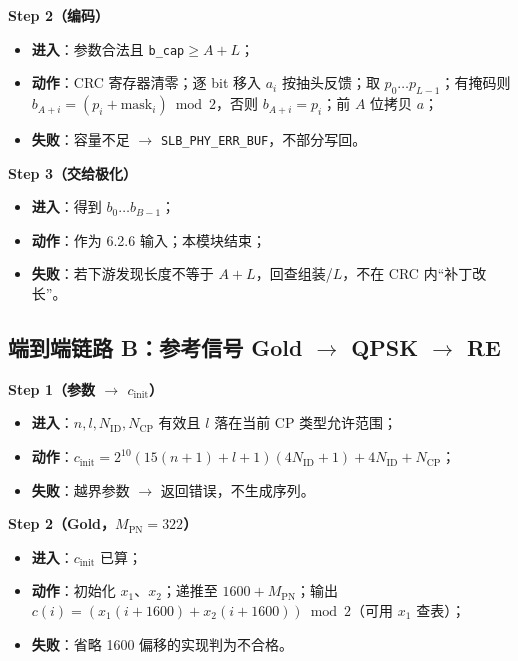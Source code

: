 \documentclass[11pt,a4paper]{ctexart}
\begin{document}
\textbf{Step 2（编码）}
\begin{itemize}[nosep]
  \item \textbf{进入}：参数合法且 \texttt{b\_cap}$\geq A{+}L$；
  \item \textbf{动作}：CRC 寄存器清零；逐 bit 移入 $a_i$ 按抽头反馈；取 $p_0\ldots p_{L-1}$；有掩码则 $b_{A+i}=(p_i+\mathrm{mask}_i)\bmod 2$，否则 $b_{A+i}=p_i$；前 $A$ 位拷贝 $a$；
  \item \textbf{失败}：容量不足 $\rightarrow$ \texttt{SLB\_PHY\_ERR\_BUF}，不部分写回。
\end{itemize}

\textbf{Step 3（交给极化）}
\begin{itemize}[nosep]
  \item \textbf{进入}：得到 $b_0\ldots b_{B-1}$；
  \item \textbf{动作}：作为 6.2.6 输入；本模块结束；
  \item \textbf{失败}：若下游发现长度不等于 $A{+}L$，回查组装/$L$，不在 CRC 内``补丁改长''。
\end{itemize}

\subsection{端到端链路 B：参考信号 Gold $\rightarrow$ QPSK $\rightarrow$ RE}

\textbf{Step 1（参数 $\rightarrow$ $c_{\mathrm{init}}$）}
\begin{itemize}[nosep]
  \item \textbf{进入}：$n,l,N_{\mathrm{ID}},N_{\mathrm{CP}}$ 有效且 $l$ 落在当前 CP 类型允许范围；
  \item \textbf{动作}：$c_{\mathrm{init}}=2^{10}(15(n{+}1)+l{+}1)(4N_{\mathrm{ID}}{+}1)+4N_{\mathrm{ID}}+N_{\mathrm{CP}}$；
  \item \textbf{失败}：越界参数 $\rightarrow$ 返回错误，不生成序列。
\end{itemize}

\textbf{Step 2（Gold，$M_{\mathrm{PN}}{=}322$）}
\begin{itemize}[nosep]
  \item \textbf{进入}：$c_{\mathrm{init}}$ 已算；
  \item \textbf{动作}：初始化 $x_1$、$x_2$；递推至 $1600{+}M_{\mathrm{PN}}$；输出 $c(i)=(x_1(i{+}1600)+x_2(i{+}1600))\bmod 2$（可用 $x_1$ 查表）；
  \item \textbf{失败}：省略 1600 偏移的实现判为不合格。
\end{itemize}
\end{document}
